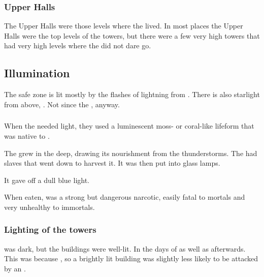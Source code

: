 \subsubsection{Upper Halls}
The Upper Halls were those levels where the \resphain lived.
In most places the Upper Halls were the top levels of the towers, but there were a few very high towers that had very high levels where the \resphain did not dare go.









\subsection{Illumination}
The \resphan{} safe zone is lit mostly by the flashes of lightning from . 
There is also starlight from above, . 
Not since the , anyway. 





\subsubsection{\Glowmoss}
\index{\glowmoss}
When the \resphain{} needed light, they used a luminescent moss- or coral-like lifeform that was native to \Nyx. 

The \glowmoss{} grew in the deep, drawing its nourishment from the thunderstorms. 
The \resphain{} had slaves that went down to harvest it. 
It was then put into glass lamps. 

It gave off a dull blue light. 

When eaten, \glowmoss was a strong but dangerous narcotic, easily fatal to mortals and very unhealthy to immortals. 





\subsubsection{Lighting of the towers}
\Nyx was dark, but the \resphan buildings were well-lit. 
In the days of \Merkyrah as well as afterwards. 
This was because , so a brightly lit building was slightly less likely to be attacked by an \umbra.

